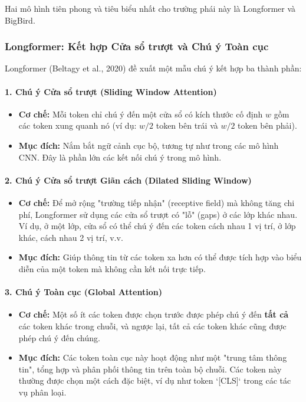 Hai mô hình tiên phong và tiêu biểu nhất cho trường phái này là Longformer và BigBird.

\subsubsection{Longformer: Kết hợp Cửa sổ trượt và Chú ý Toàn cục}
Longformer (Beltagy et al., 2020) \cite{beltagy2020longformer} đề xuất một mẫu chú ý kết hợp ba thành phần:

\paragraph{1. Chú ý Cửa sổ trượt (Sliding Window Attention)}
\begin{itemize}
    \item \textbf{Cơ chế:} Mỗi token chỉ chú ý đến một cửa sổ có kích thước cố định $w$ gồm các token xung quanh nó (ví dụ: $w/2$ token bên trái và $w/2$ token bên phải).
    \item \textbf{Mục đích:} Nắm bắt ngữ cảnh cục bộ, tương tự như trong các mô hình CNN. Đây là phần lớn các kết nối chú ý trong mô hình.
\end{itemize}

\paragraph{2. Chú ý Cửa sổ trượt Giãn cách (Dilated Sliding Window)}
\begin{itemize}
    \item \textbf{Cơ chế:} Để mở rộng "trường tiếp nhận" (receptive field) mà không tăng chi phí, Longformer sử dụng các cửa sổ trượt có "lỗ" (gaps) ở các lớp khác nhau. Ví dụ, ở một lớp, cửa sổ có thể chú ý đến các token cách nhau 1 vị trí, ở lớp khác, cách nhau 2 vị trí, v.v.
    \item \textbf{Mục đích:} Giúp thông tin từ các token xa hơn có thể được tích hợp vào biểu diễn của một token mà không cần kết nối trực tiếp.
\end{itemize}

\paragraph{3. Chú ý Toàn cục (Global Attention)}
\begin{itemize}
    \item \textbf{Cơ chế:} Một số ít các token được chọn trước được phép chú ý đến \textbf{tất cả} các token khác trong chuỗi, và ngược lại, tất cả các token khác cũng được phép chú ý đến chúng.
    \item \textbf{Mục đích:} Các token toàn cục này hoạt động như một "trung tâm thông tin", tổng hợp và phân phối thông tin trên toàn bộ chuỗi. Các token này thường được chọn một cách đặc biệt, ví dụ như token `[CLS]` trong các tác vụ phân loại.
\end{itemize}

